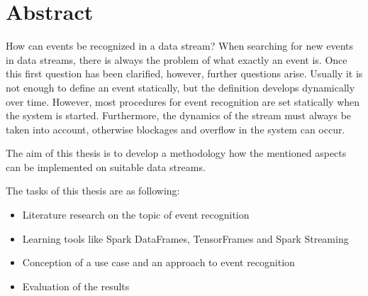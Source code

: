 \section{Abstract}

How can events be recognized in a data stream? When searching for new events in data streams,
there is always the problem of what exactly an event is.
Once this first question has been clarified, however, further questions arise.
Usually it is not enough to define an event statically, but the definition develops dynamically over time.
However, most procedures for event recognition are set statically when the system is started.
Furthermore, the dynamics of the stream must always be taken into account,
otherwise blockages and overflow in the system can occur.

The aim of this thesis is to develop a methodology how the mentioned aspects can be implemented on suitable data streams.

The tasks of this thesis are as following:
\begin{itemize}
  \item Literature research on the topic of event recognition
  \item Learning tools like Spark DataFrames, TensorFrames and Spark Streaming
  \item Conception of a use case and an approach to event recognition
  \item Evaluation of the results
\end{itemize}

